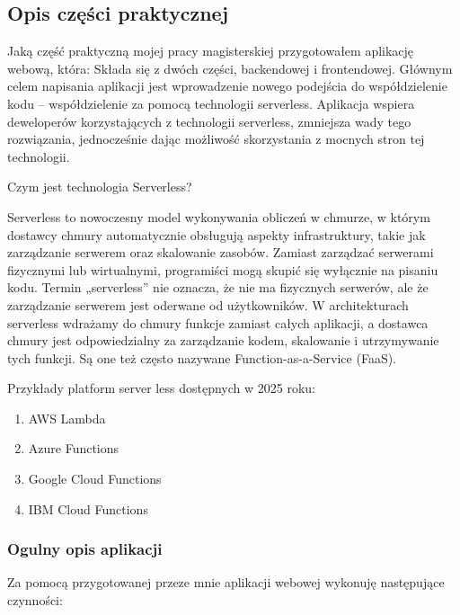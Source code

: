 \documentclass[runningheads,12pt]{llncs}
\begin{document}
\subsection{Opis części praktycznej}

Jaką część praktyczną mojej pracy magisterskiej przygotowałem aplikację webową, która:
Składa się z dwóch części, backendowej i frontendowej.
Głównym celem napisania aplikacji jest wprowadzenie nowego podejścia do współdzielenie kodu – współdzielenie za pomocą technologii serverless. Aplikacja wspiera deweloperów korzystających z technologii serverless, zmniejsza wady tego rozwiązania, jednocześnie dając możliwość skorzystania z mocnych stron tej technologii.

Czym jest technologia Serverless?

Serverless to nowoczesny model wykonywania obliczeń w chmurze, w którym dostawcy chmury automatycznie obsługują aspekty infrastruktury, takie jak zarządzanie serwerem oraz skalowanie zasobów. Zamiast zarządzać serwerami fizycznymi lub wirtualnymi, programiści mogą skupić się wyłącznie na pisaniu kodu. Termin „serverless” nie oznacza, że nie ma fizycznych serwerów, ale że zarządzanie serwerem jest oderwane od użytkowników. W architekturach serverless wdrażamy do chmury funkcje zamiast całych aplikacji, a dostawca chmury jest odpowiedzialny za zarządzanie kodem, skalowanie i utrzymywanie tych funkcji. Są one też często nazywane Function-as-a-Service (FaaS).

Przykłady platform server less dostępnych w 2025 roku:

\begin{enumerate}
    \item AWS Lambda 
    \item Azure Functions 
    \item Google Cloud Functions 
    \item IBM Cloud Functions 
\end{enumerate}

\subsubsection{Ogulny opis aplikacji}

Za pomocą przygotowanej przeze mnie aplikacji webowej wykonuję następujące czynności:
\end{document}
